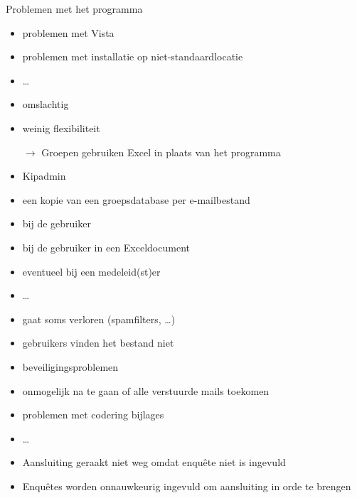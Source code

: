 \documentclass[chiro,pdf]{prosper}
\begin{document}
{
\begin{slide}{Problemen met het programma}

\begin{itemize}
{
\begin{itemize}
\item problemen met Vista
\item problemen met installatie op niet-standaardlocatie
\item \ldots
\end{itemize}
}
{
\begin{itemize}
\item omslachtig
\item weinig flexibiliteit
\item[$\rightarrow$] Groepen gebruiken Excel in plaats van het programma
\end{itemize}
}
{
\begin{itemize}
\item Kipadmin
\item een kopie van een groepsdatabase per e-mailbestand
\item bij de gebruiker
\item bij de gebruiker in een Exceldocument
\item eventueel bij een medeleid(st)er
\item \ldots
\end{itemize}
}
{
\begin{itemize}
\item gaat soms verloren (spamfilters, \ldots)
\item gebruikers vinden het bestand niet
\item beveiligingsproblemen
\item onmogelijk na te gaan of alle verstuurde mails toekomen
\item problemen met codering bijlages
\item \ldots
\end{itemize}
}
{
\begin{itemize}
\item Aansluiting geraakt niet weg omdat enqu\^ete niet is ingevuld
\item Enqu\^etes worden onnauwkeurig ingevuld om aansluiting in orde te brengen
\end{itemize}
}
\end{itemize}
\end{slide}
}
\end{document}
